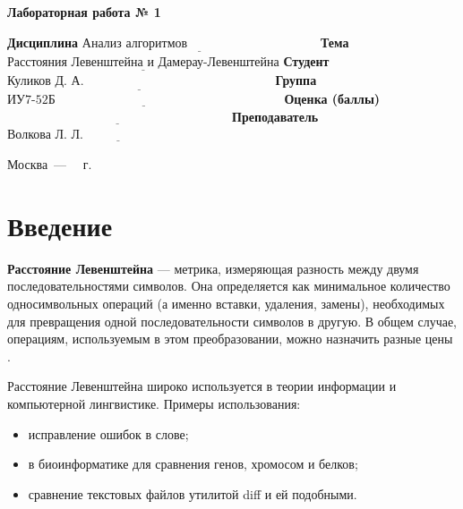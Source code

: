 \documentclass[12pt]{report}
\begin{document}
\begin{center}
\Large\textbf{Лабораторная работа № 1}
\end{center}
\vspace{\baselineskip}
\noindent\textbf{Дисциплина} $\underline{\text{Анализ алгоритмов~~~~~~~~~~~~~~~~~~~~~~~~~~~~~~~}}$\newline\newline
\noindent\textbf{Тема} $\underline{\text{Расстояния Левенштейна и Дамерау-Левенштейна}}$\newline\newline
\noindent\textbf{Студент} $\underline{\text{Куликов Д. А.~~~~~~~~~~~~~~~~~~~~~~~~~~~~~~~~~~~~~~~~~~~~~}}$\newline\newline
\noindent\textbf{Группа} $\underline{\text{ИУ7-52Б~~~~~~~~~~~~~~~~~~~~~~~~~~~~~~~~~~~~~~~~~~~~~~~~~~~~~~}}$\newline\newline
\noindent\textbf{Оценка (баллы)} $\underline{\text{~~~~~~~~~~~~~~~~~~~~~~~~~~~~~~~~~~~~~~~~~~~~~~~~~~~~~}}$\newline\newline
\noindent\textbf{Преподаватель} $\underline{\text{Волкова Л. Л.~~~~~~~~~~~~~~~~~~~~~~~~~~~~~~~~~~~}}$\newline

\begin{center}
	\vfill
	Москва~---~\the\year
	~г.
\end{center}
\clearpage

\tableofcontents

\newpage
\chapter*{Введение}
\textbf{Расстояние Левенштейна} — метрика, измеряющая разность между двумя последовательностями символов. Она определяется как минимальное количество односимвольных операций (а именно вставки, удаления, замены), необходимых для превращения одной последовательности символов в другую. В общем случае, операциям, используемым в этом преобразовании, можно назначить разные цены \cite{levbook}.\vspace{\baselineskip}

Расстояние Левенштейна широко используется в теории информации и компьютерной лингвистике. Примеры использования:

\begin{itemize}
	\item исправление ошибок в слове;
	\item в биоинформатике для сравнения генов, хромосом и белков;
	\item сравнение текстовых файлов утилитой diff и ей подобными.
\end{itemize}
\end{document}
